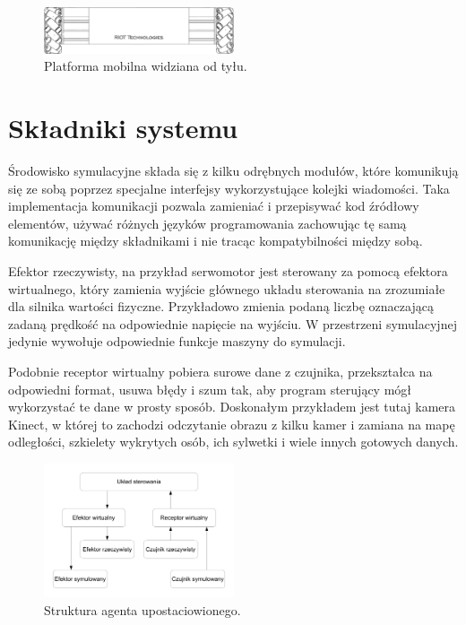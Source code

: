 \begin{figure}[H]
\centering
 \includegraphics[width=0.5\textwidth]{graphics/base_front.pdf}
\caption{Platforma mobilna widziana od tyłu.}
\end{figure} 



\section{Składniki systemu}
Środowisko symulacyjne składa się z kilku odrębnych modułów, które komunikują się ze sobą poprzez specjalne interfejsy wykorzystujące kolejki wiadomości.
Taka implementacja komunikacji pozwala zamieniać i przepisywać kod źródłowy elementów, używać różnych języków programowania zachowując tę samą komunikację między składnikami i nie tracąc kompatybilności między sobą.

Efektor rzeczywisty, na przykład serwomotor jest sterowany za pomocą efektora wirtualnego, który zamienia wyjście głównego układu sterowania na zrozumiałe dla silnika wartości fizyczne. 
Przykładowo zmienia podaną liczbę oznaczającą zadaną prędkość na odpowiednie napięcie na wyjściu. W przestrzeni symulacyjnej jedynie wywołuje odpowiednie funkcje maszyny do symulacji.

Podobnie receptor wirtualny pobiera surowe dane z czujnika, przekształca na odpowiedni format, usuwa błędy i szum tak, aby program sterujący mógł wykorzystać te dane w prosty sposób. 
Doskonałym przykładem jest tutaj kamera Kinect, w której to zachodzi odczytanie obrazu z kilku kamer i zamiana na mapę odległości, szkielety wykrytych osób, ich sylwetki i wiele innych gotowych danych.

\begin{figure}[H]
\centering
 \includegraphics[width=0.5\textwidth]{graphics/agent.pdf}
\caption{Struktura agenta upostaciowionego.}
\end{figure} 

